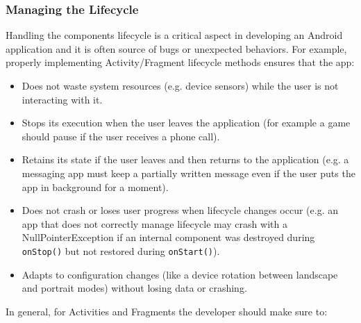 \documentclass[11pt,a4paper,notitlepage]{article}
\begin{document}
\subsubsection{Managing the Lifecycle}\label{managing_lifecycle}
Handling the components lifecycle is a critical aspect in developing an Android application and it is often source of bugs or unexpected behaviors. For example, properly implementing Activity/Fragment lifecycle methods ensures that the app:
\begin{itemize}
	\item Does not waste system resources (e.g. device sensors) while the user is not interacting with it.
	\item Stops its execution when the user leaves the application (for example a game should pause if the user receives a phone call).
	\item Retains its state if the user leaves and then returns to the application (e.g. a messaging app must keep a partially written message even if the user puts the app in background for a moment).
	\item Does not crash or loses user progress when lifecycle changes occur (e.g. an app that does not correctly manage lifecycle may crash with a NullPointerException if an internal component was destroyed during \texttt{onStop()} but not restored during \texttt{onStart()}).
	\item Adapts to configuration changes (like a device rotation between landscape and portrait modes) without losing data or crashing.
\end{itemize}\medskip
In general, for Activities and Fragments the developer should make sure to:
\end{document}
